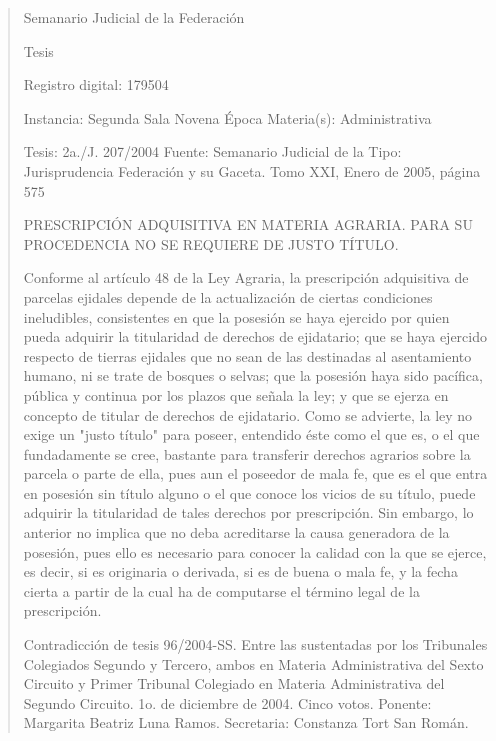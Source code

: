 \documentclass[11pt,a4paper]{article}
\begin{document}
\begin{quote}
                                                   Semanario Judicial de la Federación

                                                  Tesis

 Registro digital: 179504

 Instancia: Segunda Sala          Novena Época                         Materia(s): Administrativa

 Tesis: 2a./J. 207/2004           Fuente: Semanario Judicial de la     Tipo: Jurisprudencia
                                  Federación y su Gaceta.
                                  Tomo XXI, Enero de 2005, página
                                  575


PRESCRIPCIÓN ADQUISITIVA EN MATERIA AGRARIA. PARA SU PROCEDENCIA NO SE
REQUIERE DE JUSTO TÍTULO.


Conforme al artículo 48 de la Ley Agraria, la prescripción adquisitiva de parcelas ejidales depende
de la actualización de ciertas condiciones ineludibles, consistentes en que la posesión se haya
ejercido por quien pueda adquirir la titularidad de derechos de ejidatario; que se haya ejercido
respecto de tierras ejidales que no sean de las destinadas al asentamiento humano, ni se trate de
bosques o selvas; que la posesión haya sido pacífica, pública y continua por los plazos que señala
la ley; y que se ejerza en concepto de titular de derechos de ejidatario. Como se advierte, la ley no
exige un "justo título" para poseer, entendido éste como el que es, o el que fundadamente se cree,
bastante para transferir derechos agrarios sobre la parcela o parte de ella, pues aun el poseedor de
mala fe, que es el que entra en posesión sin título alguno o el que conoce los vicios de su título,
puede adquirir la titularidad de tales derechos por prescripción. Sin embargo, lo anterior no implica
que no deba acreditarse la causa generadora de la posesión, pues ello es necesario para conocer la
calidad con la que se ejerce, es decir, si es originaria o derivada, si es de buena o mala fe, y la
fecha cierta a partir de la cual ha de computarse el término legal de la prescripción.


Contradicción de tesis 96/2004-SS. Entre las sustentadas por los Tribunales Colegiados Segundo y
Tercero, ambos en Materia Administrativa del Sexto Circuito y Primer Tribunal Colegiado en Materia
Administrativa del Segundo Circuito. 1o. de diciembre de 2004. Cinco votos. Ponente: Margarita
Beatriz Luna Ramos. Secretaria: Constanza Tort San Román.


\end{quote}
\end{document}
